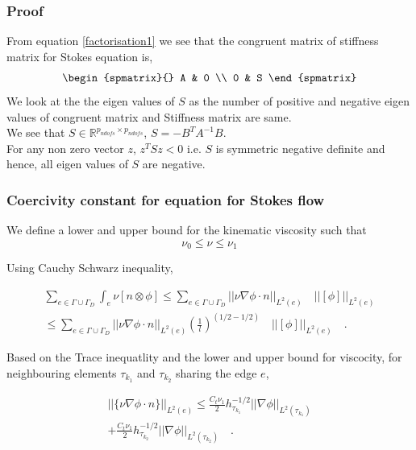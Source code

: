 \documentclass[a4paper]{book}
\begin{document}
\subsubsection{Proof}

From equation \eqref{factorisation1} we see that the congruent matrix of stiffness matrix for Stokes equation is,
\begin{equation}
\begin{spmatrix}{}
    A & 0 \\
    0 & S
\end{spmatrix}
\end{equation}
We look at the the eigen values of $S$ as the number of positive and negative eigen values of congruent matrix and Stiffness matrix are same.\\
We see that $S \in \mathbb{R}^{p_{ndofs} \times p_{ndofs}}$, $S = - B^T A^{-1} B$.\\ 
For any non zero vector $z$, $z^T S z < 0$ i.e. $S$ is symmetric negative definite and hence, all eigen values of $S$ are negative.

\subsubsection{Coercivity constant for equation for Stokes flow} \label{basics}

We define a lower and upper bound for the kinematic viscosity such that \\
\begin{equation}
\nu_0 \leq \nu \leq \nu_1
\end{equation}

Using Cauchy Schwarz inequality, 

\begin{equation}
\begin{split}
\sum_{e \in \Gamma \cup \Gamma_D} \int_e {\nu}[n \otimes \phi] \leq \sum_{e \in \Gamma \cup \Gamma_D} ||\nu \nabla \phi \cdot n||_{L^2(e)} \quad ||[\phi]||_{L^2(e)} \\ \leq \sum_{e \in \Gamma \cup \Gamma_D} ||\nu \nabla \phi \cdot n||_{L^2(e)} (\frac{1}{l})^{(1/2-1/2)} \quad ||[\phi]||_{L^2(e)} \quad \textrm{.}
\end{split}
\end{equation}

Based on the Trace inequatlity and the lower and upper bound for viscocity, for neighbouring elements $\tau_{k_1}$ and $\tau_{k_2}$ sharing the edge $e$, 

\begin{equation}
\begin{split}
||\lbrace \nu \nabla \phi \cdot n \rbrace||_{L^2(e)} \leq \frac{C_t \nu_1}{2} {h_{\tau_{k_1}}^{-1/2}} ||\nabla \phi||_{L^2({\tau_{k_1}})} \\ + \frac{C_t \nu_1}{2} {h_{{\tau_{k_2}}}^{-1/2}} ||\nabla \phi||_{L^2({\tau_{k_2}})} \quad \textrm{.}
\end{split}
\end{equation}
\end{document}

